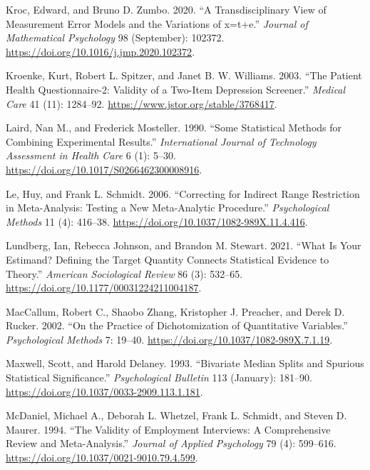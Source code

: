 \documentclass[
  letterpaper,
  DIV=11,
  numbers=noendperiod]{scrreprt}
\newlength{\cslhangindent}
\newenvironment{CSLReferences}[2] %
 {\begin{list}{}{%
  \setlength{\itemindent}{0pt}
  \setlength{\leftmargin}{0pt}
  \setlength{\parsep}{0pt}
  \ifodd #1
   \setlength{\leftmargin}{\cslhangindent}
   \setlength{\itemindent}{-1\cslhangindent}
  \fi
  \setlength{\itemsep}{#2\baselineskip}}}
 {\end{list}}
\begin{document}
\begin{CSLReferences}{1}{0}
Kroc, Edward, and Bruno D. Zumbo. 2020. {``A Transdisciplinary View of
Measurement Error Models and the Variations of x=t+e.''} \emph{Journal
of Mathematical Psychology} 98 (September): 102372.
\url{https://doi.org/10.1016/j.jmp.2020.102372}.

Kroenke, Kurt, Robert L. Spitzer, and Janet B. W. Williams. 2003. {``The
Patient Health Questionnaire-2: Validity of a Two-Item Depression
Screener.''} \emph{Medical Care} 41 (11): 1284--92.
\url{https://www.jstor.org/stable/3768417}.

Laird, Nan M., and Frederick Mosteller. 1990. {``Some Statistical
Methods for Combining Experimental Results.''} \emph{International
Journal of Technology Assessment in Health Care} 6 (1): 5--30.
\url{https://doi.org/10.1017/S0266462300008916}.

Le, Huy, and Frank L. Schmidt. 2006. {``Correcting for Indirect Range
Restriction in Meta-Analysis: Testing a New Meta-Analytic Procedure.''}
\emph{Psychological Methods} 11 (4): 416--38.
\url{https://doi.org/10.1037/1082-989X.11.4.416}.

Lundberg, Ian, Rebecca Johnson, and Brandon M. Stewart. 2021. {``What Is
Your Estimand? Defining the Target Quantity Connects Statistical
Evidence to Theory.''} \emph{American Sociological Review} 86 (3):
532--65. \url{https://doi.org/10.1177/00031224211004187}.

MacCallum, Robert C., Shaobo Zhang, Kristopher J. Preacher, and Derek D.
Rucker. 2002. {``On the Practice of Dichotomization of Quantitative
Variables.''} \emph{Psychological Methods} 7: 19--40.
\url{https://doi.org/10.1037/1082-989X.7.1.19}.

Maxwell, Scott, and Harold Delaney. 1993. {``Bivariate Median Splits and
Spurious Statistical Significance.''} \emph{Psychological Bulletin} 113
(January): 181--90. \url{https://doi.org/10.1037/0033-2909.113.1.181}.

McDaniel, Michael A., Deborah L. Whetzel, Frank L. Schmidt, and Steven
D. Maurer. 1994. {``The Validity of Employment Interviews: A
Comprehensive Review and Meta-Analysis.''} \emph{Journal of Applied
Psychology} 79 (4): 599--616.
\url{https://doi.org/10.1037/0021-9010.79.4.599}.


\end{CSLReferences}
\end{document}
